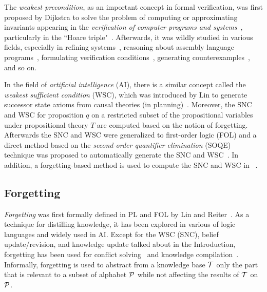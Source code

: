 \documentclass[sn-mathphys]{sn-jnl}%
\theoremstyle{thmstyleone}%
\theoremstyle{thmstyletwo}%
\theoremstyle{thmstylethree}%
\begin{document}
The \emph{weakest precondition}, as an important concept in formal verification, was first proposed %
by Dijkstra to solve the problem of computing or approximating invariants appearing in the  \emph{verification of computer programs and systems}~\cite{DBLP:journals/cacm/Dijkstra75}, particularly in the ``Hoare triple"~\cite{Hoare1969}.
Afterwards, it was wildly studied in various fields, especially in 
refining systems~\cite{woodcock1990refinement},
reasoning about assembly language programs~\cite{legato2002weakest},
formulating verification conditions~\cite{DBLP:journals/ipl/Leino05}, 
generating counterexamples~\cite{dailler2018instrumenting}, and so on.

In the field of \emph{artificial intelligence} (AI), there is a similar concept called the \emph{weakest sufficient condition} (WSC), which was introduced by Lin to generate successor state axioms from causal theories (in planning)~\cite{DBLP:Lin:AIJ:2001,lin2003compiling}. Moreover, the SNC and WSC for proposition $q$ on a restricted subset of the propositional variables under propositional theory $T$ are computed based on the notion of forgetting.
Afterwards the SNC and WSC were generalized to first-order logic (FOL) and a direct method based
on the \emph{second-order quantifier elimination} (SOQE) technique was proposed to automatically generate the SNC and WSC~\cite{doherty2001computing}. In addition, a forgetting-based method is used to compute the SNC and WSC in \CTL~\cite{feng2020sufficient}.

\subsection{Forgetting}
\emph{Forgetting}
was first formally defined in PL and FOL by Lin and Reiter~\cite{Fangzhen:forgetit,eiter2019brief}.
As a technique for distilling knowledge, it has been explored in various of logic languages and widely used in AI. %
Except for the WSC (SNC), belief update/revision, and knowledge update talked about in the Introduction, forgetting has been used for conflict solving~\cite{DBLP:Zhang:AIJ2006,Lang2010Reasoning} and knowledge compilation~\cite{Bienvenu2010Knowledge}.
Informally, forgetting is used to abstract from a knowledge base ${\cal T}$ only the part that is relevant to a subset of alphabet ${\cal P}$ while not affecting the results of ${\cal T}$ on ${\cal P}$.
\end{document}

